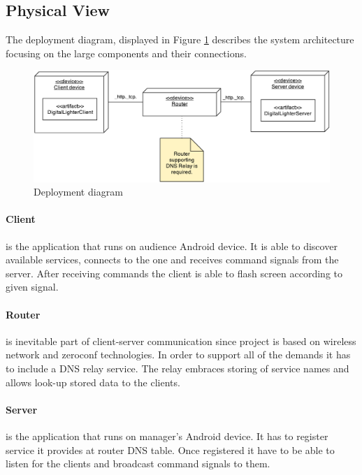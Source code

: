 \subsection{Physical View}
The deployment diagram, displayed in Figure \ref{fig:deployment_diagram} describes the system architecture focusing on the large components and their connections.

\begin{figure}[H]
	\centering
		\includegraphics[width=15cm]{images/deployment-diagram-sprint1}
	\caption{Deployment diagram}
	\label{fig:deployment_diagram}
\end{figure}

\paragraph{Client}
is the application that runs on audience Android device. It is able to discover available services, connects to the one and receives command signals from the server. After receiving commands the client is able to flash screen according to given signal.

\paragraph{Router}
is inevitable part of client-server communication since project is based on wireless network and zeroconf technologies. In order to support all of the demands it has to include a DNS relay service. The relay embraces storing of service names and allows look-up stored data to the clients.

\paragraph{Server}
is the application that runs on manager's Android device. It has to register service it provides at router DNS table. Once registered it have to be able to listen for the clients and broadcast command signals to them.

